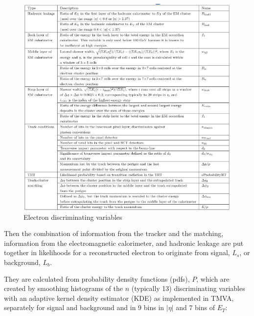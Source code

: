 \documentclass[a4paper, oneside]{book}
\begin{document}
			\begin{figure}
				\centering
				\includegraphics[width=0.45\textheight]{tesi_images/el_discr.png}
				\caption{Electron discriminating variables}
				\label{fig:el_discr}
			\end{figure}
			Then the combination of information from the tracker and the matching, information from the electromagnetic calorimeter, and hadronic leakage  are put together in likelihoods for a reconstructed electron to originate from signal,
			$L_s$, or background, $L_b$. 
			
			
			
			
			They are calculated from probability density functions (pdfs), $P$, which are created by smoothing histograms of the $n$ (typically 13) discriminating variables with an adaptive kernel density estimator (KDE) as implemented in TMVA, separately for signal and background and in 9 bins in $|\eta|$ and 7 bins of $E_T$:
\end{document}
